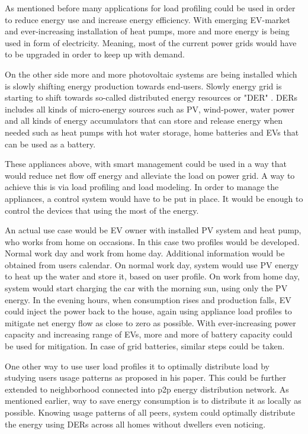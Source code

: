 \documentclass[
11pt, %
english, %
singlespacing, %
headsepline, %
]{MastersDoctoralThesis} %
\begin{document}
As mentioned before many applications for load profiling could be used in order to reduce energy use 
and increase energy efficiency. With emerging EV-market and ever-increasing installation of heat pumps,
more and more energy is being used in form of electricity. Meaning, most of the current power grids would have to 
be upgraded in order to keep up with demand.

On the other side more and more photovoltaic systems
are being installed which is slowly shifting energy production towards end-users. Slowly energy grid
is starting to shift towards so-called distributed energy resources or "DER" \cite{MORENOJARAMILLO2021445}. DERs includes all kinds of 
micro-energy sources such as PV, wind-power, water power and all kinds of energy accumulators that can store 
and release energy when needed such as heat pumps with hot water storage, home batteries and EVs that can be 
used as a battery.

These appliances above, with smart management could be used in a way that would
reduce net flow off energy and alleviate the load on power grid.
A way to achieve this is via load profiling and load modeling. 
In order to manage the appliances, a control system would have to be put in place. 
It would be enough to control the devices that using the most of the energy.

An actual use case would be EV owner with installed PV system and heat pump, who works from home on occasions. 
In this case two profiles would be developed. Normal work day and work from home day.
Additional information would be obtained from users calendar. 
On normal work day, system would use PV energy to heat up the water and store it, based on user profile.
On work from home day, system would start charging the car with the morning sun, using only the PV energy. 
In the evening hours, when consumption rises and production falls, EV could inject the power back to the house, again using appliance load profiles 
to mitigate net energy flow as close to zero as possible. 
With ever-increasing power capacity and increasing range of EVs, more and more of battery capacity could 
be used for mitigation. In case of grid batteries, similar steps could be taken.

One other way to use user load profiles it to optimally distribute load by studying users usage patterns as \cite{Chuan2014} proposed in his paper. 
This could be further extended to neighborhood connected into p2p energy distribution network.
As mentioned earlier, way to save energy consumption is to distribute it as locally as possible. 
Knowing usage patterns of all peers, system could optimally distribute the energy using DERs across all homes without dwellers even noticing.
\end{document}
